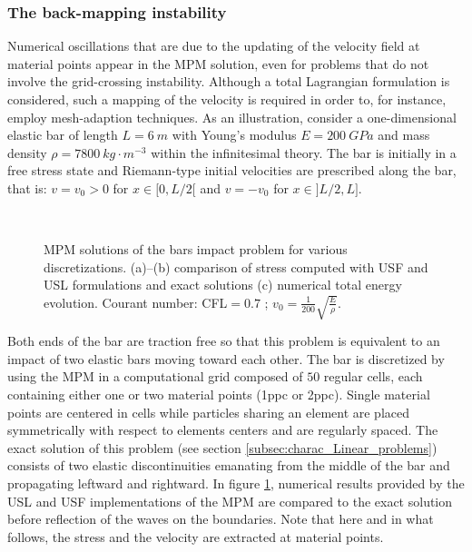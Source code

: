 \subsubsection*{The back-mapping instability}
Numerical oscillations that are due to the updating of the velocity field at material points \cite{Mass_Flip} appear in the MPM solution, even for problems that do not involve the grid-crossing instability.
Although a total Lagrangian formulation is considered, such a mapping of the velocity is required in order to, for instance, employ mesh-adaption techniques.
As an illustration, consider a one-dimensional elastic bar of length $L=6\:m$ with Young's modulus $E=200 \:GPa$ and mass density $\rho=7800 \:kg\cdot m^{-3}$ within the infinitesimal theory.
The bar is initially in a free stress state and Riemann-type initial velocities are prescribed along the bar, that is: $v=v_0>0$ for $x\in[0,L/2[$ and $v=-v_0$ for $x \in ]L/2,L]$.
\begin{figure}[ht]
  \centering
  {  \label{subfig:US_diffusion_10}}
  {  \label{subfig:US_diffusion_25}}\\
  {  \label{subfig:US_energies}}
  \caption{MPM solutions of the bars impact problem for various discretizations. (a)--(b) comparison of stress computed with USF and USL formulations and exact solutions (c) numerical total energy evolution. Courant number: CFL$=0.7$ ; $v_0=\frac{1}{200}\sqrt{\frac{E}{\rho}}$.}
  \label{fig:US_diffusion}
\end{figure}
Both ends of the bar are traction free so that this problem is equivalent to an impact of two elastic bars moving toward each other.
The bar is discretized by using the MPM in a computational grid composed of $50$ regular cells, each containing either one or two material points (1ppc or 2ppc).
Single material points are centered in cells while particles sharing an element are placed symmetrically with respect to elements centers and are regularly spaced.
The exact solution of this problem (see section \ref{subsec:charac_Linear_problems}) consists of two elastic discontinuities emanating from the middle of the bar and propagating leftward and rightward.
In figure \ref{fig:US_diffusion}, numerical results provided by the USL and USF implementations of the MPM are compared to the exact solution before reflection of the waves on the boundaries. 
Note that here and in what follows, the stress and the velocity are extracted at material points.

